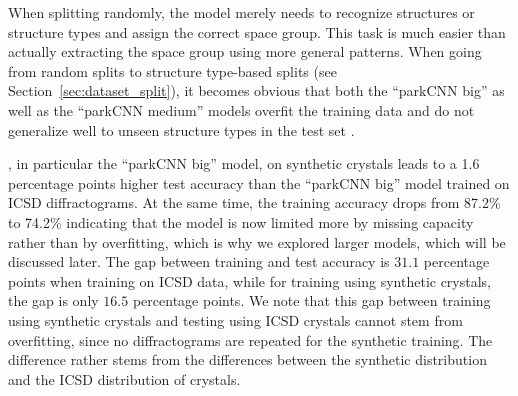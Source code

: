     When splitting randomly, the model merely needs to recognize structures or
    structure types and assign the correct space group. This task is much easier
    than actually extracting the space group using more general patterns. When
    going from random splits to structure type-based splits (see
    Section~\ref{sec:dataset_split}), it becomes obvious that both the ``parkCNN
    big'' as well as the ``parkCNN medium'' models overfit the training data and
    do not generalize well to unseen structure types in the test set . 

    , in particular the ``parkCNN big'' model, on synthetic crystals leads
    to a 1.6 percentage points higher test accuracy than the ``parkCNN big''
    model trained on ICSD diffractograms. At the same time, the training
    accuracy drops from  87.2\%  to 74.2\% 
    indicating that the model is now limited more by missing capacity rather
    than by overfitting, which is why we explored larger models, which will be
    discussed later. The gap between training and test accuracy is $31.1$
    percentage points when training on ICSD data, while for training using
    synthetic crystals, the gap is only $16.5$ percentage points. We note that
    this gap between training using synthetic crystals and testing using ICSD
    crystals cannot stem from overfitting, since no diffractograms are repeated
    for the synthetic training. The difference rather stems from the differences
    between the synthetic distribution and the ICSD distribution of crystals.

